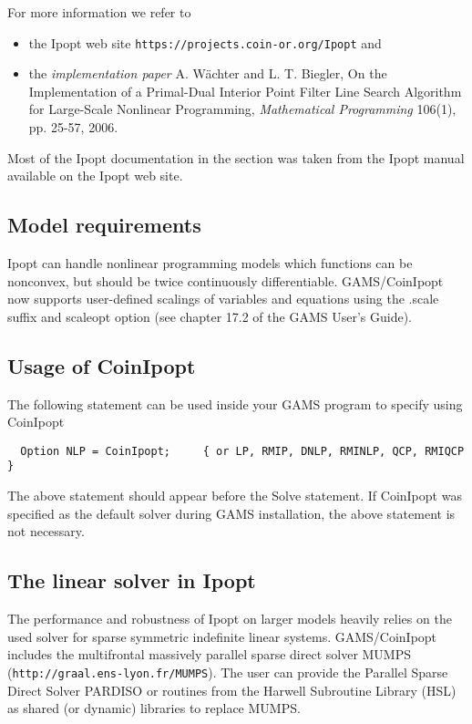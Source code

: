 For more information we refer to
\begin{itemize}
\item the Ipopt web site \texttt{https://projects.coin-or.org/Ipopt} and
\item the \emph{implementation paper} A. W\"achter and L. T. Biegler, On the Implementation of a Primal-Dual Interior Point Filter Line Search Algorithm for Large-Scale Nonlinear Programming, \emph{Mathematical Programming} 106(1), pp. 25-57, 2006.
\end{itemize}
Most of the Ipopt documentation in the section was taken from the Ipopt manual available on the Ipopt web site.

\subsection{Model requirements}

Ipopt can handle nonlinear programming models which functions can be nonconvex, but should be twice continuously differentiable.
GAMS/CoinIpopt now supports user-defined scalings of variables and equations using the .scale suffix and scaleopt option (see chapter 17.2 of the GAMS User's Guide).

\subsection{Usage of CoinIpopt}

The following statement can be used inside your GAMS program to specify using CoinIpopt
\begin{verbatim}
  Option NLP = CoinIpopt;     { or LP, RMIP, DNLP, RMINLP, QCP, RMIQCP }
\end{verbatim}

The above statement should appear before the Solve statement.
If CoinIpopt was specified as the default solver during GAMS installation, the above statement is not necessary.

\subsection{The linear solver in Ipopt}
\label{ipoptlinearsolver}
\hypertarget{ipoptlinearsolver}{}

The performance and robustness of Ipopt on larger models heavily relies on the used solver for sparse symmetric indefinite linear systems.
GAMS/CoinIpopt includes the multifrontal massively parallel sparse direct solver MUMPS (\texttt{http://graal.ens-lyon.fr/MUMPS}).
The user can provide the Parallel Sparse Direct Solver PARDISO or routines from the Harwell Subroutine Library (HSL) as shared (or dynamic) libraries to replace MUMPS.

